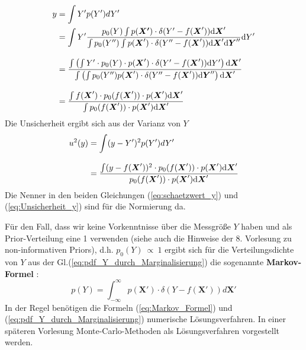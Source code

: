 \begin{align}
y &= \int Y' p(Y') dY' \nonumber\\
&=  \int Y'\frac{\textstyle p_0(Y) \int p(\boldsymbol{X'}) \cdot \delta(Y'-f(\boldsymbol{X}')) \mathrm{d} \boldsymbol{X}' }
{\textstyle \int p_0(Y'')\int  p(\boldsymbol{X}') \cdot \delta(Y''-f(\boldsymbol{X}')) \mathrm{d} \boldsymbol{X}'\mathrm{d} \boldsymbol{Y}'' } \mathrm{d} Y'  \nonumber \\[2ex]
&= \frac{\textstyle\int \left( \int Y' \cdot p_0(Y) \cdot p(\boldsymbol{X}') \cdot \delta(Y'-f(\boldsymbol{X}'))\mathrm{d}Y' \right) \mathrm{d} \boldsymbol{X}' }
{\textstyle \int \left(\int p_0(Y'') p(\boldsymbol{X}') \cdot \delta(Y''-f(\boldsymbol{X}')) \mathrm{d}  \boldsymbol{Y}'' \right) \mathrm{d} \boldsymbol{X}'}\nonumber \\[2ex]
&=  \frac{\textstyle\int f(\boldsymbol{X}') \cdot p_0(f(\boldsymbol{X}')) \cdot p(\boldsymbol{X}')  \mathrm{d} \boldsymbol{X}' }
{\textstyle \int   p_0(f(\boldsymbol{X}')) \cdot p(\boldsymbol{X}')
	\mathrm{d} \boldsymbol{X}'}  \label{eq:schaetzwert_y}
\end{align}
Die Unsicherheit ergibt sich aus der Varianz von $Y$
\begin{align}
u^2(y) &= \int (y-Y')^2 p(Y') dY' \nonumber \\[2ex]
&= \frac{\textstyle \int (y-f(\boldsymbol{X}'))^2 \cdot p_0(f(\boldsymbol{X}'))
	\cdot p(\boldsymbol{X}') \mathrm{d} \boldsymbol{X}' }
{\textstyle p_0(f(\boldsymbol{X}')) \cdot p(\boldsymbol{X}') \mathrm{d} \boldsymbol{X}'}
\label{eq:Unsicherheit_y}
\end{align}
Die Nenner in den beiden Gleichungen (\ref{eq:schaetzwert_y}) und
(\ref{eq:Unsicherheit_y}) sind für die Normierung da.

Für den Fall, dass wir keine Vorkenntnisse über die Messgröße $Y$
haben und als Prior-Verteilung eine 1 verwenden (siehe auch
die Hinweise der 8. Vorlesung zu non-informativen Priors), d.h.
$p_0(Y)~\propto~1$ ergibt sich für die Verteilungsdichte von $Y$ aus
der Gl.(\ref{eq:pdf_Y_durch_Marginalisierung}) die sogenannte
\textbf{Markov-Formel} \cite{Cox06}:
\begin{equation}
p(Y) = \int_{-\infty}^{\infty}
p(\boldsymbol{X}') \cdot \delta (Y-f(\boldsymbol{X}')) d \boldsymbol{X}'
\label{eq:Markov_Formel}
\end{equation}
In der Regel benötigen die Formeln (\ref{eq:Markov_Formel}) und (\ref{eq:pdf_Y_durch_Marginalisierung}) numerische Lösungsverfahren. In
einer späteren Vorlesung Monte-Carlo-Methoden als Lösungsverfahren vorgestellt werden.

